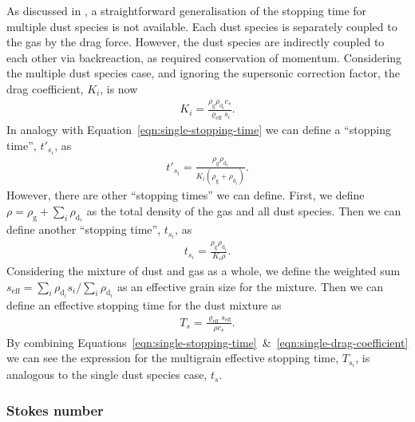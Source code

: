 \documentclass[fleqn,usenatbib]{mnras}
\newcommand{\g}{\mathrm{g}}
\newcommand{\dd}{\mathrm{d}}
\begin{document}
As discussed in \citet{Hutchison2018MNRAS.476.2186H}, a straightforward
generalisation of the stopping time for multiple dust species is not available.
Each dust species is separately coupled to the gas by the drag force. However,
the dust species are indirectly coupled to each other via backreaction, as
required conservation of momentum. Considering the multiple dust species case,
and ignoring the supersonic correction factor, the drag coefficient, \(K_i\), is
now
%
\begin{align}
   \label{eqn:drag-coefficient}
   K_i = \frac{\rho_{\g} \rho_{\dd_i} c_s}{\varrho_{\mathrm{eff}} s_i}.
\end{align}
%
In analogy with Equation~\ref{eqn:single-stopping-time} we can define a
``stopping time'', \(t'_{s_i}\), as
%
\begin{align}
   \label{eqn:alternative-stopping-time}
   t'_{s_i} = \frac{\rho_{\g} \rho_{\dd_i}}{K_i (\rho_{\g} + \rho_{\dd_i})}.
\end{align}
%
However, there are other ``stopping times'' we can define. First, we define
\(\rho = \rho_{\g} + \sum_i \rho_{\dd_i}\) as the total density of the gas and
all dust species. Then we can define another ``stopping time'', \(t_{s_i}\), as
%
\begin{align}
   \label{eqn:stopping-time}
   t_{s_i} = \frac{\rho_{\g} \rho_{\dd_i}}{K_i \rho}.
\end{align}
%
Considering the mixture of dust and gas as a whole, we define the weighted sum
\(s_{\mathrm{eff}} = \sum_i \rho_{\dd_i} s_i / \sum_i \rho_{\dd_i}\) as an
effective grain size for the mixture. Then we can define an effective stopping
time for the dust mixture as
%
\begin{align}
   \label{eqn:effective-stopping-time}
   T_s = \frac{\varrho_{\mathrm{eff}} s_{\mathrm{eff}}}{\rho c_s}.
\end{align}
%
By combining
Equations~\ref{eqn:single-stopping-time}~\&~\ref{eqn:single-drag-coefficient} we
can see the expression for the multigrain effective stopping time, \(T_{s_i}\),
is analogous to the single dust species case, \(t_s\).

\subsubsection{Stokes number}
\end{document}

